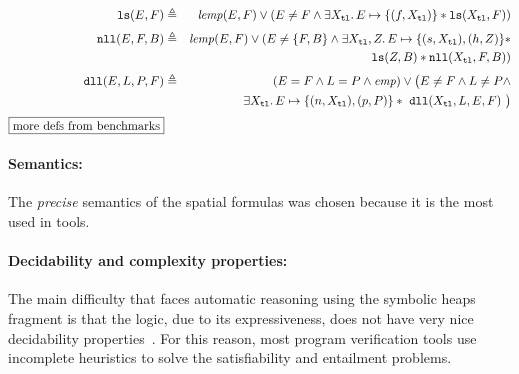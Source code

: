 \documentclass{llncs}
\newcommand{\sep}{.\,}
\newcommand{\posep}{*}
\newcommand{\points}{\mapsto}
\newcommand{\cdr}{\mathtt{tl}}
\newcommand{\lemp}{\mathit{lemp}}
\newcommand{\ls}{\mathtt{ls}}
\newcommand{\dll}{\mathtt{dll}}
\newcommand{\nll}{\mathtt{nll}}
\begin{document}
\begin{table}
\begin{eqnarray}
\ls(E,F) & \triangleq & \mathit{lemp}(E,F)\lor (E\neq F \land
\exists X_\cdr\sep E\points\{(f,X_\cdr)\}\posep \ls(X_\cdr,F))
\\[1mm]
\nll(E,F,B) & \triangleq & \lemp(E,F)\lor (E\neq \{F,B\}
\land \exists X_\cdr,Z\sep E\points\{(s,X_\cdr),(h,Z)\}\posep\\ 
&& \ls(Z,B) \posep\nll(X_\cdr,F,B)) \nonumber
\\[1mm]
\dll(E, L, P, F) & \triangleq & (E=F\land L=P\land \mathit{emp}) \lor \big( E\neq F \land L\neq P \land \\
&& \exists X_\cdr\sep E\points \{(n,X_\cdr),(p,P)\} \posep\ \dll(X_\cdr,L,E,F)\ \big)\nonumber
\\[1mm]
\fbox{more defs from benchmarks}
\end{eqnarray}

\caption{Examples of recursive definitions used in the benchmark %
%
}
\label{tab:RD}

\end{table}

\paragraph{Semantics:}
The \emph{precise} semantics of the spatial formulas was chosen because it is the most used in tools.


\paragraph{Decidability and complexity properties:}
The main difficulty that faces automatic reasoning using the symbolic heaps fragment is that the logic, 
due to its expressiveness, does not have very nice decidability properties~\cite{AntonopoulosGHKO14}.
For this reason, most program verification tools use incomplete heuristics to solve the satisfiability and entailment problems.
\end{document}
